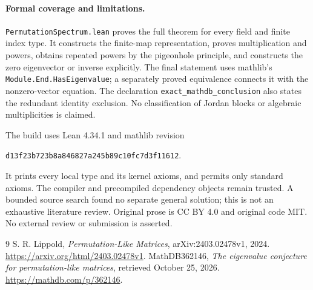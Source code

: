 \documentclass[11pt]{article}
\begin{document}
\paragraph{Formal coverage and limitations.}
\texttt{PermutationSpectrum.lean} proves the full theorem for every field and
finite index type. It constructs the finite-map representation, proves
multiplication and powers, obtains repeated powers by the pigeonhole principle,
and constructs the zero eigenvector or inverse explicitly. The final statement
uses mathlib's \texttt{Module.End.HasEigenvalue}; a separately proved equivalence
connects it with the nonzero-vector equation. The declaration
\texttt{exact\_mathdb\_conclusion} also states the redundant identity exclusion.
No classification of Jordan blocks or algebraic multiplicities is claimed.

The build uses Lean 4.34.1 and mathlib revision
\begin{center}\small\texttt{d13f23b723b8a846827a245b89c10fc7d3f11612}.\end{center}
It prints every local type and
its kernel axioms, and permits only standard axioms. The compiler and
precompiled dependency objects remain trusted. A bounded source search found
no separate general solution; this is not an exhaustive literature review.
Original prose is CC BY 4.0 and original code MIT. No external review or
submission is asserted.
\begin{thebibliography}{9}
 S. R. Lippold, \emph{Permutation-Like Matrices},
arXiv:2403.02478v1, 2024.
\url{https://arxiv.org/html/2403.02478v1}.
 MathDB362146, \emph{The eigenvalue conjecture for
permutation-like matrices}, retrieved October 25, 2026.
\url{https://mathdb.com/p/362146}.
\end{thebibliography}
\end{document}
